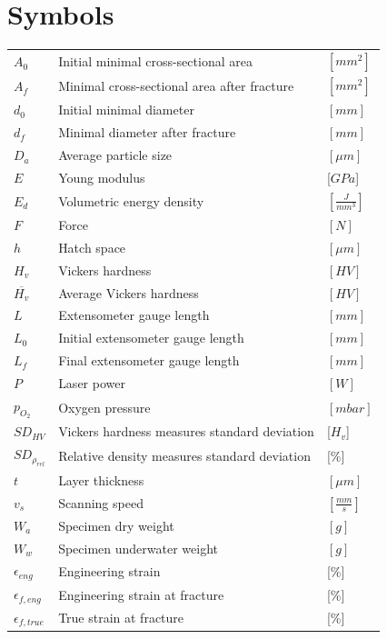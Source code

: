 \documentclass[
11pt, %
british, %
singlespacing, %
headsepline, %
]{MastersDoctoralThesis} %
\begin{document}
\chapter*{Symbols}%
\begin{tabular}{lll}

\centering

$A_0$ & Initial minimal cross-sectional area & $[mm^2]$\\
$A_f$ & Minimal cross-sectional area after fracture & $[mm^2]$\\
$d_0$ & Initial minimal diameter & $[mm]$\\ 
$d_f$ & Minimal diameter after fracture& $[mm]$\\ 
$D_a$ & Average particle size & $[\mu m]$\\ 
$E$ & Young modulus & [$GPa$]\\
$E_d$ & Volumetric energy density & $[\frac{J}{mm^3}]$\\
$F$ & Force &$ [N] $\\
$h$ & Hatch space & $[\mu m]$\\
$H_v$ & Vickers hardness & $[HV]$\\
$\overline{H_v}$ & Average Vickers hardness & $[HV]$\\
$L$ & Extensometer gauge length & $[mm]$\\
$L_0$ & Initial extensometer gauge length &$[mm]$\\
$L_f$ & Final extensometer gauge length &$[mm]$\\
$P$ & Laser power & $[W]$ \\
$p_{O_2}$ & Oxygen pressure & $[mbar]$\\
$SD_{HV}$ & Vickers hardness measures standard deviation & [$H_v$]\\
$SD_{\rho_{rel}}$ & Relative density measures standard deviation & [$\%$]\\
$t$ & Layer thickness & $[\mu m]$\\
$v_s$ & Scanning speed & $[\frac{mm}{s}]$ \\
$W_a$ & Specimen dry weight& $ [g]$ \\
$W_w$ & Specimen underwater weight & $[g]$\\
\addlinespace
\addlinespace
$\epsilon_{eng}$ & Engineering strain & [\%]\\
$\epsilon_{f,eng}$ & Engineering strain at fracture & [\%]\\
$\epsilon_{f,true}$ & True strain at fracture & [\%]\\

\end{tabular}
\end{document}
